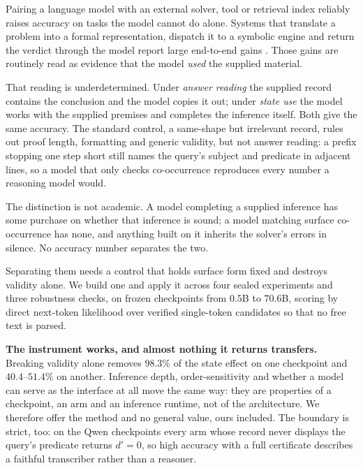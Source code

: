 \documentclass{article}
\begin{document}
Pairing a language model with an external solver, tool or retrieval index
reliably raises accuracy on tasks the model cannot do alone. Systems that
translate a problem into a formal representation, dispatch it to a symbolic
engine and return the verdict through the model report large end-to-end gains
\citep{pan2023logiclm,olausson2023linc,ye2023satlm,gao2022pal,schick2023toolformer,yang2023leandojo,lewis2020retrievalaugmented}.
Those gains are routinely read as evidence that the model \emph{used} the
supplied material.

That reading is underdetermined. Under \emph{answer reading} the supplied record
contains the conclusion and the model copies it out; under \emph{state use} the
model works with the supplied premises and completes the inference itself. Both
give the same accuracy. The standard control, a same-shape but irrelevant
record, rules out proof length, formatting and generic validity, but not answer
reading: a prefix stopping one step short still names the query's subject and
predicate in adjacent lines, so a model that only checks co-occurrence
reproduces every number a reasoning model would.

The distinction is not academic. A model completing a supplied inference has
some purchase on whether that inference is sound; a model matching surface
co-occurrence has none, and anything built on it inherits the solver's errors in
silence. No accuracy number separates the two.

Separating them needs a control that holds surface form fixed and destroys
validity alone. We build one and apply it across four sealed experiments and three
robustness checks, on frozen checkpoints from $0.5$B to $70.6$B, scoring by
direct next-token likelihood over verified single-token candidates so that no
free text is parsed.

\textbf{The instrument works, and almost nothing it returns transfers.}
Breaking validity alone removes $98.3\%$ of the state effect on one checkpoint
and $40.4$--$51.4\%$ on another. Inference depth, order-sensitivity and whether
a model can serve as the interface at all move the same way: they are properties
of a checkpoint, an arm and an inference runtime, not of the architecture. We
therefore offer the method and no general value, ours included. The boundary is
strict, too: on the Qwen checkpoints every arm whose record never displays the
query's predicate returns $d' = 0$, so high accuracy with a full certificate
describes a faithful transcriber rather than a reasoner.
\end{document}
